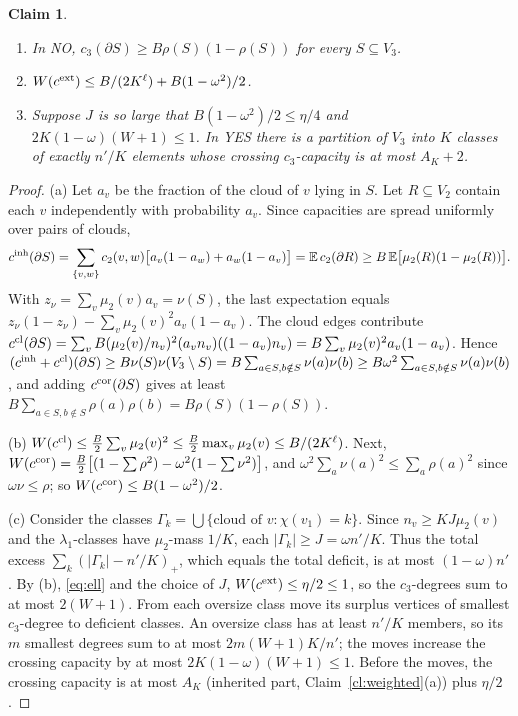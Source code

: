 \documentclass[11pt,letterpaper]{article}
\newtheorem{claim}[theorem]{Claim}
\theoremstyle{definition}
\theoremstyle{remark}
\newcommand{\E}{\mathbb E}
\begin{document}
\begin{claim}\label{cl:counts}
\begin{enumerate}[label=\textup{(\alph*)}]
\item In NO, \(c_3(\partial S)\ge B\rho(S)(1-\rho(S))\) for every
\(S\subseteq V_3\).
\item \(W(c^{\rm ext})\le B/(2K^\ell)+B(1-\omega^2)/2\).
\item Suppose \(J\) is so large that \(B(1-\omega^2)/2\le\eta/4\) and
\(2K(1-\omega)(W+1)\le1\). In YES there is a partition of \(V_3\) into \(K\)
classes of exactly \(n'/K\) elements whose crossing \(c_3\)-capacity is at
most \(A_K+2\).
\end{enumerate}
\end{claim}

\begin{proof}
(a) Let \(a_v\) be the fraction of the cloud of \(v\) lying in \(S\). Let
\(R\subseteq V_2\) contain each \(v\) independently with probability
\(a_v\). Since capacities are spread uniformly over pairs of clouds,
\[
c^{\rm inh}(\partial S)=\sum_{\{v,w\}}c_2(v,w)\bigl[a_v(1-a_w)+a_w(1-a_v)\bigr]
=\E\,c_2(\partial R)\ge B\,\E\bigl[\mu_2(R)(1-\mu_2(R))\bigr].
\]
With \(z_\nu=\sum_v\mu_2(v)a_v=\nu(S)\), the last expectation equals
\(z_\nu(1-z_\nu)-\sum_v\mu_2(v)^2a_v(1-a_v)\). The cloud edges contribute
\(c^{\rm cl}(\partial S)=\sum_vB(\mu_2(v)/n_v)^2(a_vn_v)((1-a_v)n_v)
=B\sum_v\mu_2(v)^2a_v(1-a_v)\). Hence
\((c^{\rm inh}+c^{\rm cl})(\partial S)\ge B\nu(S)\nu(V_3\setminus S)
=B\sum_{a\in S,b\notin S}\nu(a)\nu(b)\ge B\omega^2\sum_{a\in S,b\notin
S}\nu(a)\nu(b)\), and adding \(c^{\rm cor}(\partial S)\) gives at least
\(B\sum_{a\in S,b\notin S}\rho(a)\rho(b)=B\rho(S)(1-\rho(S))\).

(b) \(W(c^{\rm cl})\le\frac B2\sum_v\mu_2(v)^2\le\frac B2\max_v\mu_2(v)\le
B/(2K^\ell)\). Next,
\(W(c^{\rm cor})=\frac B2\bigl[(1-\sum\rho^2)-\omega^2(1-\sum\nu^2)\bigr]\),
and \(\omega^2\sum_a\nu(a)^2\le\sum_a\rho(a)^2\) since \(\omega\nu\le\rho\);
so \(W(c^{\rm cor})\le B(1-\omega^2)/2\).

(c) Consider the classes \(\Gamma_k=\bigcup\{\text{cloud of }v:\chi(v_1)=k\}\).
Since \(n_v\ge KJ\mu_2(v)\) and the \(\lambda_1\)-classes have
\(\mu_2\)-mass \(1/K\), each \(|\Gamma_k|\ge J=\omega n'/K\). Thus the total
excess \(\sum_k(|\Gamma_k|-n'/K)_+\), which equals the total deficit, is at
most \((1-\omega)n'\). By (b), \eqref{eq:ell} and the choice of \(J\),
\(W(c^{\rm ext})\le\eta/2\le1\), so the \(c_3\)-degrees sum to at most
\(2(W+1)\). From each oversize class move its surplus vertices of smallest
\(c_3\)-degree to deficient classes. An oversize class has at least \(n'/K\)
members, so its \(m\) smallest degrees sum to at most \(2m(W+1)K/n'\); the
moves increase the crossing capacity by at most \(2K(1-\omega)(W+1)\le1\).
Before the moves, the crossing capacity is at most \(A_K\) (inherited part,
Claim~\ref{cl:weighted}(a)) plus \(\eta/2\).
\end{proof}
\end{document}
